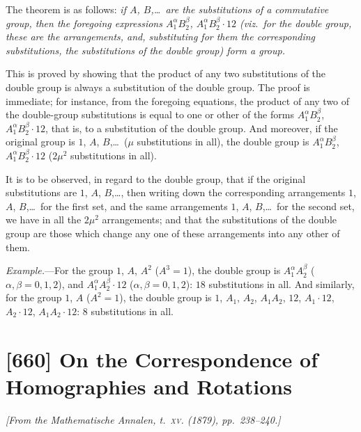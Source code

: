 \documentclass[11pt,a4paper]{article}
\theoremstyle{plain}
\theoremstyle{definition}
\begin{document}
The theorem is as follows: \emph{if $A$, $B$,\ldots\ are the substitutions of a commutative group, then the foregoing expressions $A_1^\alpha B_2^\beta$, $A_1^\alpha B_2^\beta \cdot 12$ (viz.~for the double group, these are the arrangements, and, substituting for them the corresponding substitutions, the substitutions of the double group) form a group.}

This is proved by showing that the product of any two substitutions of the double group is always a substitution of the double group. The proof is immediate; for instance, from the foregoing equations, the product of any two of the double-group substitutions is equal to one or other of the forms $A_1^\alpha B_2^\beta$, $A_1^\alpha B_2^\beta \cdot 12$, that is, to a substitution of the double group. And moreover, if the original group is $1$, $A$, $B$,\ldots\ ($\mu$ substitutions in all), the double group is $A_1^\alpha B_2^\beta$, $A_1^\alpha B_2^\beta \cdot 12$ ($2\mu^2$ substitutions in all).

It is to be observed, in regard to the double group, that if the original substitutions are $1$, $A$, $B$,\ldots, then writing down the corresponding arrangements $1$, $A$, $B$,\ldots\ for the first set, and the same arrangements $1$, $A$, $B$,\ldots\ for the second set, we have in all the $2\mu^2$ arrangements; and that the substitutions of the double group are those which change any one of these arrangements into any other of them.

\medskip

\noindent\textit{Example.}---For the group $1$, $A$, $A^2$ ($A^3 = 1$), the double group is $A_1^\alpha A_2^\beta$ ($\alpha, \beta = 0, 1, 2$), and $A_1^\alpha A_2^\beta \cdot 12$ ($\alpha, \beta = 0, 1, 2$): $18$ substitutions in all. And similarly, for the group $1$, $A$ ($A^2 = 1$), the double group is $1$, $A_1$, $A_2$, $A_1 A_2$, $12$, $A_1 \cdot 12$, $A_2 \cdot 12$, $A_1 A_2 \cdot 12$: $8$ substitutions in all.

\newpage
\section{[660] On the Correspondence of Homographies and Rotations}
\label{sec:660}

\noindent\textit{[From the \emph{Mathematische Annalen}, t.~\textsc{xv}. (1879), pp.~238--240.]}
\end{document}
